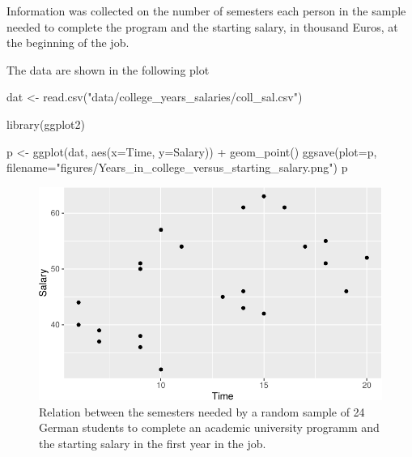 \documentclass[
  letterpaper,
]{scrbook}
\newenvironment{Shaded}{\begin{snugshade}}{\end{snugshade}}
\newcommand{\AttributeTok}[1]{\textcolor[rgb]{0.40,0.45,0.13}{#1}}
\newcommand{\FunctionTok}[1]{\textcolor[rgb]{0.28,0.35,0.67}{#1}}
\newcommand{\NormalTok}[1]{\textcolor[rgb]{0.00,0.23,0.31}{#1}}
\newcommand{\OtherTok}[1]{\textcolor[rgb]{0.00,0.23,0.31}{#1}}
\newcommand{\SpecialCharTok}[1]{\textcolor[rgb]{0.37,0.37,0.37}{#1}}
\newcommand{\StringTok}[1]{\textcolor[rgb]{0.13,0.47,0.30}{#1}}
\begin{document}
Information was collected on the number of semesters each person in the
sample needed to complete the program and the starting salary, in
thousand Euros, at the beginning of the job.

The data are shown in the following plot

\begin{Shaded}
\begin{Highlighting}[]
\NormalTok{dat }\OtherTok{\textless{}{-}} \FunctionTok{read.csv}\NormalTok{(}\StringTok{"data/college\_years\_salaries/coll\_sal.csv"}\NormalTok{)}

\FunctionTok{library}\NormalTok{(ggplot2)}

\NormalTok{p }\OtherTok{\textless{}{-}} \FunctionTok{ggplot}\NormalTok{(dat, }\FunctionTok{aes}\NormalTok{(}\AttributeTok{x=}\NormalTok{Time, }\AttributeTok{y=}\NormalTok{Salary)) }\SpecialCharTok{+}
     \FunctionTok{geom\_point}\NormalTok{()}
\FunctionTok{ggsave}\NormalTok{(}\AttributeTok{plot=}\NormalTok{p, }\AttributeTok{filename=}\StringTok{"figures/Years\_in\_college\_versus\_starting\_salary.png"}\NormalTok{)}
\NormalTok{p}
\end{Highlighting}
\end{Shaded}

\begin{figure}[H]

{\centering \includegraphics{./introduction_files/figure-pdf/Years_in_college_versus_starting_salary-1.pdf}

}

\caption{Relation between the semesters needed by a random sample of 24
German students to complete an academic university programm and the
starting salary in the first year in the job.}

\end{figure}
\end{document}
